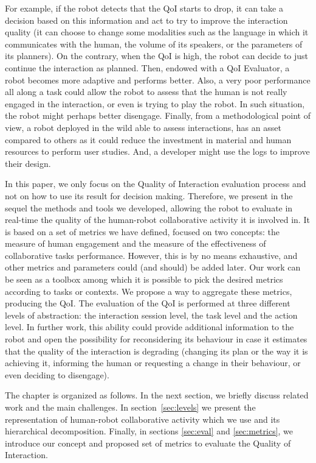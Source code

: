 \documentclass[a4paper,11pt,twoside]{StyleThese}
\begin{document}
For example, if the robot detects that the QoI starts to drop, it can take a decision based on this information and act to try to improve the interaction quality (\eg it can choose to change some modalities such as the language in which it communicates with the human, the volume of its speakers, or the parameters of its planners). On the contrary, when the QoI is high, the robot can decide to just continue the interaction as planned. Then, endowed with a QoI Evaluator, a robot becomes more adaptive and performs better. Also, a very poor performance all along a task could allow the robot to assess that the human is not really engaged in the interaction, or even is trying to play the robot. In such situation, the robot might perhaps better disengage. 
Finally, from a methodological point of view, a robot deployed in the wild able to assess interactions, has an asset compared to others as it could reduce the investment in material and human resources to perform user studies. And, a developer might use the logs to improve their design. 

In this paper, we only focus on the Quality of Interaction evaluation process and not on how to use its result for decision making. Therefore,  we present in the sequel the methods and tools we developed, allowing the robot to evaluate in real-time the quality of the human-robot collaborative activity it is involved in. It is based on a set of metrics we have defined, focused on two concepts: the measure of human engagement and the measure of the effectiveness of collaborative tasks performance. However, this is by no means exhaustive, and other metrics and parameters could (and should) be added later. Our work can be seen as a toolbox among which it is possible to pick the desired metrics according to tasks or contexts. We propose a way to aggregate these metrics, producing the QoI. The evaluation of the QoI is performed at three different levels of abstraction: the interaction session level, the task level and the action level. In further work, this ability could provide additional information to the robot and open the possibility for reconsidering its behaviour in case it estimates that the quality of the interaction is degrading (\eg changing its plan or the way it is achieving it, informing the human or requesting a change in their behaviour, or even deciding to disengage).

The chapter is organized as follows. In the next section, we briefly discuss related work and the main challenges. In section~\ref{sec:levels} we present the representation of human-robot collaborative activity which we use and its hierarchical  decomposition. Finally, in sections \ref{sec:eval} and \ref{sec:metrics}, we introduce our concept and proposed set of metrics to evaluate the Quality of Interaction.
\end{document}
